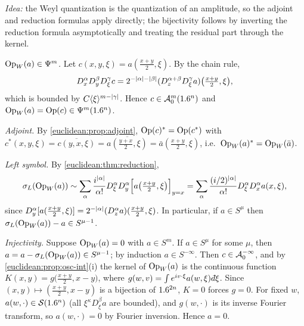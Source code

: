 \subsection*{}

\emph{Idea:} the Weyl quantization is the quantization of an amplitude, so the adjoint
and reduction formulas apply directly; the bijectivity follows by inverting the
reduction formula asymptotically and treating the residual part through the kernel.

\emph{$\operatorname{Op}_W(a)\in\Psi^{m}$.} Let $c(x,y,\xi)=a(\frac{x+y}2,\xi)$. By the chain rule,
\begin{equation*}
  D^\alpha_xD^\beta_yD^\gamma_\xi c=2^{-\lvert \alpha\rvert-\lvert \beta\rvert}(D^{\alpha+\beta}_zD^\gamma_\xi a)\bigl(\tfrac{x+y}2,\xi\bigr),
\end{equation*}
which is bounded by $C\langle \xi\rangle^{m-\lvert \gamma\rvert}$. Hence $c\in\mathcal{A}^{m}_{0}(1.6^n)$ and
$\operatorname{Op}_W(a)=\operatorname{Op}(c)\in\Psi^{m}(1.6^n)$.

\emph{Adjoint.} By \cref{euclidean:prop:adjoint}, $\operatorname{Op}(c)^*=\operatorname{Op}(c^*)$ with
$c^*(x,y,\xi)=\overline{c(y,x,\xi)}=\overline{a(\frac{y+x}2,\xi)}=\bar a(\frac{x+y}2,\xi)$,
i.e.\ $\operatorname{Op}_W(a)^*=\operatorname{Op}_W(\bar a)$.

\emph{Left symbol.} By \cref{euclidean:thm:reduction},
\begin{equation*}
  \sigma_L(\operatorname{Op}_W(a))\sim\sum_\alpha\frac{i^{\lvert \alpha\rvert}}{\alpha!}D^\alpha_\xi D^\alpha_y
  \Bigl[a\bigl(\tfrac{x+y}2,\xi\bigr)\Bigr]_{y=x}
  =\sum_\alpha\frac{(i/2)^{\lvert \alpha\rvert}}{\alpha!}D^\alpha_\xi D^\alpha_xa(x,\xi),
\end{equation*}
since $D^\alpha_y[a(\frac{x+y}2,\xi)]=2^{-\lvert \alpha\rvert}(D^\alpha_za)(\frac{x+y}2,\xi)$. In
particular, if $a\in S^\mu$ then $\sigma_L(\operatorname{Op}_W(a))-a\in S^{\mu-1}$.

\emph{Injectivity.} Suppose $\operatorname{Op}_W(a)=0$ with $a\in S^m$. If $a\in S^\mu$ for some $\mu$,
then $a=a-\sigma_L(\operatorname{Op}_W(a))\in S^{\mu-1}$; by induction $a\in S^{-\infty}$. Then
$c\in\mathcal{A}^{-\infty}_{0}$, and by \cref{euclidean:prop:osc-int}(i) the kernel of
$\operatorname{Op}_W(a)$ is the continuous function
$K(x,y)=g\bigl(\frac{x+y}2,x-y\bigr)$, where
$g(w,v)=\int e^{iv\cdot\xi}a(w,\xi)\,\dbar\xi$. Since
$(x,y)\mapsto(\frac{x+y}2,x-y)$ is a bijection of $1.6^{2n}$, $K=0$ forces $g=0$. For fixed
$w$, $a(w,\cdot)\in\mathcal{S}(1.6^n)$ (all $\xi^\kappa D^\beta_\xi a$ are bounded), and $g(w,\cdot)$
is its inverse Fourier transform, so $a(w,\cdot)=0$ by Fourier inversion. Hence $a=0$.

